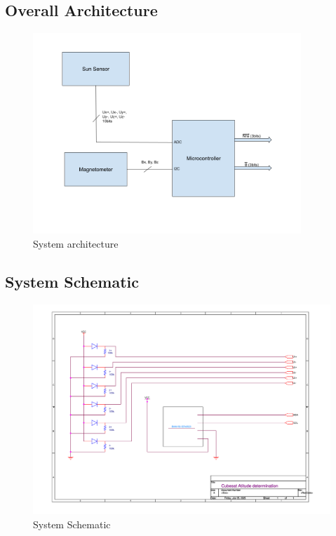 \documentclass[a4paper, 12pt]{article}
\begin{document}
\subsection{Overall Architecture}
\begin{figure}[H]  %
    \centering
    \includegraphics[width=0.9\textwidth]{fig/Architecture_globale.png}
    \caption{System architecture}
    \label{fig:System architecture}
\end{figure}


\subsection{System Schematic}
\begin{figure}[H]  %
    \centering
    \includegraphics[width=1\textwidth]{fig/cubesatSchematic.png}
    \caption{System Schematic}
    \label{fig:System Schematic}
\end{figure}
\end{document}
